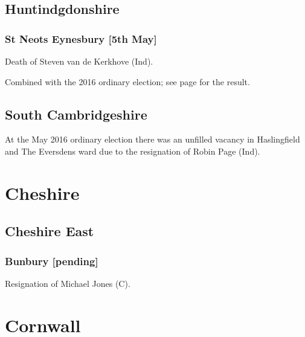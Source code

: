 \documentclass[a4paper,openany]{book}
\begin{document}
\begin{resultsiii}
\subsection*{Huntindgdonshire}

\subsubsection*{St Neots Eynesbury \hspace*{\fill}\nolinebreak[1]%
\enspace\hspace*{\fill}
[5th May]}


Death of Steven van de Kerkhove (Ind).

Combined with the 2016 ordinary election; see page \pageref{StNeotsEynesburyHuntingdonshire} for the result.

\subsection*{South Cambridgeshire}

At the May 2016 ordinary election there was an unfilled vacancy in Haslingfield and The Eversdens ward due to the resignation of Robin Page (Ind).

\section{Cheshire}

\subsection*{Cheshire East}

\subsubsection*{Bunbury \hspace*{\fill}\nolinebreak[1]%
\enspace\hspace*{\fill}
[pending]}


Resignation of Michael Jones (C).

\section{Cornwall}


\end{resultsiii}
\end{document}
